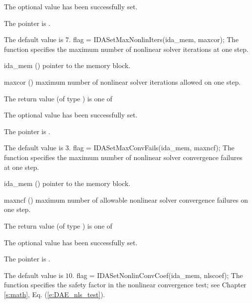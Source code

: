{{\begin{args}
    The optional value has been successfully set.
  \item[\Id{IDA\_MEM\_NULL}]
    The  pointer is .
  \end{args}
}
{
  The default value is $7$.
}
{
flag = IDASetMaxNonlinIters(ida\_mem, maxcor);
}
{
  The function  specifies the maximum
  number of nonlinear solver iterations at one step.
}
{
  \begin{args}
  \item[ida\_mem] ()
    pointer to the {\ida} memory block.
  \item[maxcor] ()
    maximum number of nonlinear solver iterations allowed on one step.
  \end{args}
}
{
  The return value  (of type ) is one of
  \begin{args}
  \item[\Id{IDA\_SUCCESS}] 
    The optional value has been successfully set.
  \item[\Id{IDA\_MEM\_NULL}]
    The  pointer is .
  \end{args}
}
{
  The default value is $3$.
}
{
flag = IDASetMaxConvFails(ida\_mem, maxncf);
}
{
  The function  specifies the
  maximum number of nonlinear solver convergence failures at one step.
}
{
  \begin{args}
  \item[ida\_mem] ()
    pointer to the {\ida} memory block.
  \item[maxncf] ()
    maximum number of allowable nonlinear solver convergence failures
    on one step.
  \end{args}
}
{
  The return value  (of type ) is one of
  \begin{args}
  \item[\Id{IDA\_SUCCESS}] 
    The optional value has been successfully set.
  \item[\Id{IDA\_MEM\_NULL}]
    The  pointer is .
  \end{args}
}
{
  The default value is $10$.
}
{
flag = IDASetNonlinConvCoef(ida\_mem, nlscoef);
}
{
  The function  specifies the safety factor
  in the nonlinear convergence test;
  see Chapter \ref{s:math}, Eq. (\ref{e:DAE_nls_test}).
}
{
  \begin{args}

\end{args}}}
